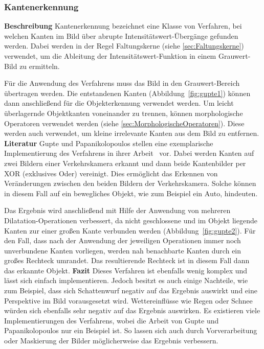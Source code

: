 \subsubsection{Kantenerkennung}
\textbf{Beschreibung}\newline
Kantenerkennung bezeichnet eine Klasse von Verfahren, bei welchen Kanten im Bild über abrupte Intensitätswert-Übergänge gefunden werden. 
Dabei werden in der Regel Faltungskerne (siehe \ref{sec:Faltungskerne}) verwendet, um die Ableitung der Intensitätswert-Funktion in einem Grauwert-Bild zu ermitteln.

Für die Anwendung des Verfahrens muss das Bild in den Grauwert-Bereich übertragen werden.
Die entstandenen Kanten (Abbildung~\ref{fig:gupte1}) können dann anschließend für die Objekterkennung verwendet werden. 
Um leicht überlagernde Objektkanten voneinander zu trennen, können morphologische Operatoren verwendet werden (siehe \ref{sec:MorphologischeOperatoren}).
Diese werden auch verwendet, um kleine irrelevante Kanten aus dem Bild zu entfernen.
\newline\newline
\textbf{Literatur}\newline
Gupte und Papanikolopoulos stellen eine exemplarische Implementierung  des Verfahrens in ihrer Arbeit~\cite{gupte2000algorithms} vor. 
Dabei werden Kanten auf zwei Bildern einer Verkehrskamera erkannt und dann beide Kantenbilder per XOR (exklusives Oder) vereinigt. 
Dies ermöglicht das Erkennen von Veränderungen zwischen den beiden Bildern der Verkehrskamera.
Solche können in diesem Fall auf ein bewegliches Objekt, wie zum Beispiel ein Auto, hindeuten.

Das Ergebnis wird anschließend mit Hilfe der Anwendung von mehreren Dilatation-Operationen verbessert, da nicht geschlossene und im Objekt liegende Kanten zur einer großen Kante verbunden werden (Abbildung~\ref{fig:gupte2}).
Für den Fall, dass nach der Anwendung der jeweiligen Operationen immer noch unverbundene Kanten vorliegen, werden nah benachbarte Kanten durch ein großes Rechteck umrandet.
Das resultierende Rechteck ist in diesem Fall dann das erkannte Objekt.
\newline\newline
\textbf{Fazit}\newline
Dieses Verfahren ist ebenfalls wenig komplex und lässt sich einfach implementieren. 
Jedoch besitzt es auch einige Nachteile, wie zum Beispiel, dass sich Schattenwurf negativ auf das Ergebnis auswirkt und eine Perspektive im Bild vorausgesetzt wird.
Wettereinflüsse wie Regen oder Schnee würden sich ebenfalls sehr negativ auf das Ergebnis auswirken.
Es existieren viele Implementierungen des Verfahrens, wobei die Arbeit von Gupte und Papanikolopoulos nur ein Beispiel ist.
So lassen sich auch durch Vorverarbeitung oder Maskierung der Bilder möglicherweise das Ergebnis verbessern.

